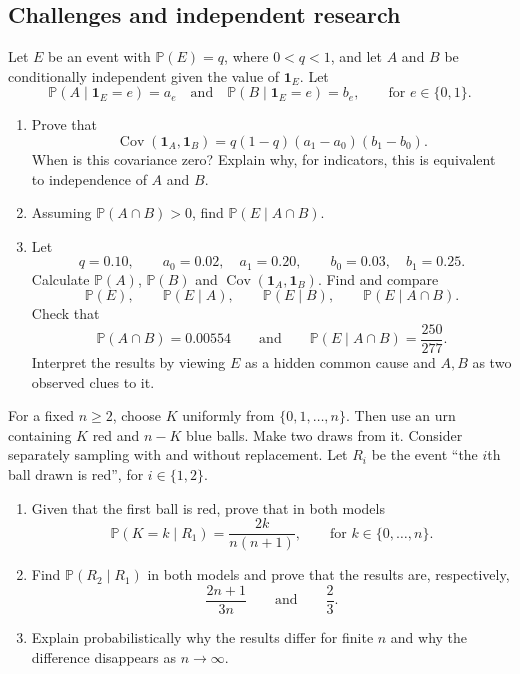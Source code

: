 \documentclass[11pt,a4paper]{article}
\newenvironment{enumeratea}{\begin{enumerate}[label=(\alph*),itemsep=0.28em,topsep=0.25em]}{\end{enumerate}}
\newcommand{\Pbb}{\mathbb P}
\newcommand{\Cov}{\operatorname{Cov}}
\newcommand{\ind}{\mathbf 1}
\newcounter{problem}[section]
\begin{document}
\subsection*{Challenges and independent research}
\begin{problemstar}
Let $E$ be an event with $\Pbb(E)=q$, where $0<q<1$, and let $A$ and $B$ be
conditionally independent given the value of $\ind_E$. Let
\[
\Pbb(A\mid \ind_E=e)=a_e
\quad\text{and}\quad
\Pbb(B\mid \ind_E=e)=b_e,
\qquad\text{for }e\in\{0,1\}.
\]
\begin{enumeratea}
  \item Prove that
  \[ \Cov(\ind_A,\ind_B)=q(1-q)(a_1-a_0)(b_1-b_0). \]
  When is this covariance zero? Explain why, for indicators, this is equivalent
  to independence of $A$ and $B$.
  \item Assuming $\Pbb(A\cap B)>0$, find $\Pbb(E\mid A\cap B)$.
  \item Let
  \[ q=0.10,\qquad a_0=0.02,\quad a_1=0.20,\qquad b_0=0.03,\quad b_1=0.25. \]
  Calculate $\Pbb(A)$, $\Pbb(B)$ and $\Cov(\ind_A,\ind_B)$. Find and compare
  \[ \Pbb(E),\qquad\Pbb(E\mid A),\qquad\Pbb(E\mid B),\qquad\Pbb(E\mid A\cap B). \]
  Check that
  \[ \Pbb(A\cap B)=0.00554\qquad\text{and}\qquad\Pbb(E\mid A\cap B)=\frac{250}{277}. \]
  Interpret the results by viewing $E$ as a hidden common cause and $A,B$ as two observed clues to it.
\end{enumeratea}
\end{problemstar}
\begin{problemstar}
For a fixed $n\ge2$, choose $K$ uniformly from $\{0,1,\dots,n\}$. Then use an
urn containing $K$ red and $n-K$ blue balls. Make two draws from it.
Consider separately sampling with and without replacement. Let $R_i$ be the event
``the $i$th ball drawn is red'', for $i\in\{1,2\}$.
\begin{enumeratea}
  \item Given that the first ball is red, prove that in both models
  \[ \Pbb(K=k\mid R_1)=\frac{2k}{n(n+1)},\qquad\text{for }k\in\{0,\dots,n\}. \]
  \item Find $\Pbb(R_2\mid R_1)$ in both models and prove that the results are, respectively,
  \[ \frac{2n+1}{3n}\qquad\text{and}\qquad\frac23. \]
  \item Explain probabilistically why the results differ for finite $n$ and why
  the difference disappears as $n\to\infty$.
\end{enumeratea}
\end{problemstar}
\end{document}
